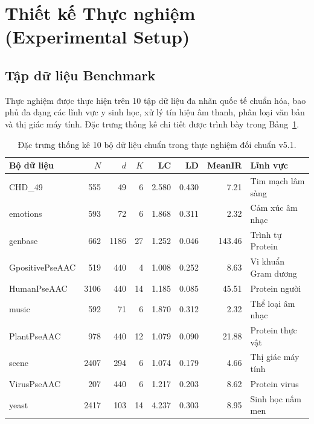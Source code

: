 \documentclass[11pt,a4paper]{article}
\begin{document}
\section{Thiết kế Thực nghiệm (Experimental Setup)}
\label{sec:experiments}

\subsection{Tập dữ liệu Benchmark}
Thực nghiệm được thực hiện trên 10 tập dữ liệu đa nhãn quốc tế chuẩn hóa, bao phủ đa dạng các lĩnh vực y sinh học, xử lý tín hiệu âm thanh, phân loại văn bản và thị giác máy tính. Đặc trưng thống kê chi tiết được trình bày trong Bảng~\ref{tab:datasets}.

\begin{table}[htbp]
\centering
\caption{Đặc trưng thống kê 10 bộ dữ liệu chuẩn trong thực nghiệm đối chuẩn v5.1.}
\label{tab:datasets}
\small
\begin{tabular}{lrrrrrrl}
\toprule
\textbf{Bộ dữ liệu} & \textbf{$N$} & \textbf{$d$} & \textbf{$K$} & \textbf{LC} & \textbf{LD} & \textbf{MeanIR} & \textbf{Lĩnh vực} \\
\midrule
CHD\_49 & 555 & 49 & 6 & 2.580 & 0.430 & 7.21 & Tim mạch lâm sàng \\
emotions & 593 & 72 & 6 & 1.868 & 0.311 & 2.32 & Cảm xúc âm nhạc \\
genbase & 662 & 1186 & 27 & 1.252 & 0.046 & 143.46 & Trình tự Protein \\
GpositivePseAAC & 519 & 440 & 4 & 1.008 & 0.252 & 8.63 & Vi khuẩn Gram dương \\
HumanPseAAC & 3106 & 440 & 14 & 1.185 & 0.085 & 45.51 & Protein người \\
music & 592 & 71 & 6 & 1.870 & 0.312 & 2.32 & Thể loại âm nhạc \\
PlantPseAAC & 978 & 440 & 12 & 1.079 & 0.090 & 21.88 & Protein thực vật \\
scene & 2407 & 294 & 6 & 1.074 & 0.179 & 4.66 & Thị giác máy tính \\
VirusPseAAC & 207 & 440 & 6 & 1.217 & 0.203 & 8.62 & Protein virus \\
yeast & 2417 & 103 & 14 & 4.237 & 0.303 & 8.95 & Sinh học nấm men \\
\bottomrule
\end{tabular}
\end{table}
\end{document}
